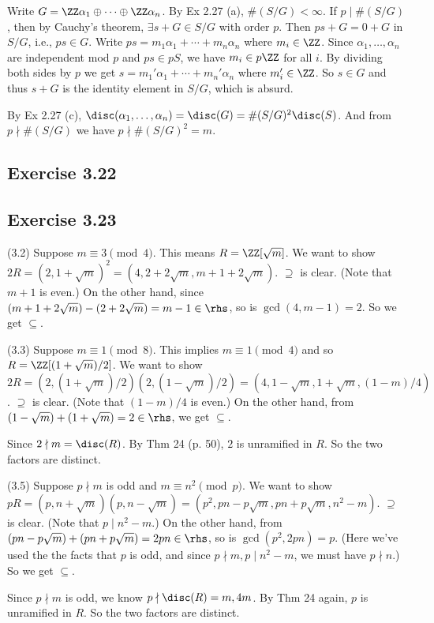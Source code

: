 \documentclass[../Chapter.tex]{subfiles}
\begin{document}
Write $G=\ZZ\alpha_1\oplus\cdots\oplus\ZZ\alpha_n$. By Ex 2.27 (a), $\#(S/G)<\infty$. If $p\mid \#(S/G)$, then by Cauchy's theorem, $\exists s+G\in S/G$ with order $p$. Then $ps+G=0+G$ in $S/G$, i.e., $ps\in G$. Write $ps=m_1\alpha_1+\cdots+m_n\alpha_n$ where $m_i\in\ZZ$. Since $\alpha_1,\ldots,\alpha_n$ are independent mod $p$ and $ps\in pS$, we have $m_i\in p\ZZ$ for all $i$. By dividing both sides by $p$ we get $s=m_1'\alpha_1+\cdots+m_n'\alpha_n$ where $m'_i\in\ZZ$. So $s\in G$ and thus $s+G$ is the identity element in $S/G$, which is absurd.

By Ex 2.27 (c), $\disc(\alpha_1,\ldots,\alpha_n)=\disc(G)=\#(S/G)^2\disc(S)$. And from $p\nmid \#(S/G)$ we have $p\nmid \#(S/G)^2=m$.

\subsection*{Exercise 3.22}

\subsection*{Exercise 3.23}

(3.2) Suppose $m\equiv 3\pmod{4}$. This means $R=\ZZ[\sqrt{m}]$. We want to show $2R=(2,1+\sqrt{m})^2=(4,2+2\sqrt{m},m+1+2\sqrt{m})$. $\supseteq$ is clear. (Note that $m+1$ is even.) On the other hand,
since $(m+1+2\sqrt{m})-(2+2\sqrt{m})=m-1\in\rhs$, so is $\gcd(4,m-1)=2$. So we get $\subseteq$.

(3.3) Suppose $m\equiv 1\pmod{8}$. This implies $m\equiv 1\pmod{4}$ and so $R=\ZZ[{(1+\sqrt{m})/2}]$. We want to show $2R=(2,(1+\sqrt{m})/2)(2,(1-\sqrt{m})/2)=(4,1-\sqrt{m},1+\sqrt{m},(1-m)/4)$. $\supseteq$ is clear. (Note that $(1-m)/4$ is even.) On the other hand, from $(1-\sqrt{m})+(1+\sqrt{m})=2\in\rhs$, we get $\subseteq$.

Since $2\nmid m=\disc(R)$. By Thm 24 (p. 50), $2$ is unramified in $R$. So the two factors are distinct.

(3.5) Suppose $p\nmid m$ is odd and $m\equiv n^2\pmod{p}$. We want to show $pR=(p,n+\sqrt{m})(p,n-\sqrt{m})=(p^2,pn-p\sqrt{m},pn+p\sqrt{m},n^2-m)$. $\supseteq$ is clear. (Note that $p\mid n^2-m$.) On the other hand, from $(pn-p\sqrt{m})+(pn+p\sqrt{m})=2pn\in\rhs$, so is $\gcd(p^2,2pn)=p$. (Here we've used the the facts that $p$ is odd, and since $p\nmid m,p\mid n^2-m$, we must have $p\nmid n$.) So we get $\subseteq$.

Since $p\nmid m$ is odd, we know $p\nmid\disc(R)=m,4m$. By Thm 24 again, $p$ is unramified in $R$. So the two factors are distinct.
\end{document}
